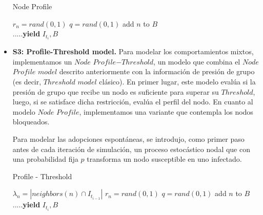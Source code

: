 \documentclass{article}
\begin{document}
\begin{itemize}
\begin{algorithm} 
	\caption{Node Profile}
	\begin{algorithmic}[1]	
		\State $r_n = rand(0,1)$
		\Else 
			\State $ q = rand(0,1)$
			\State add $n$ to $B$
			\EndIf
		\EndIf
		\EndIf
		\EndFor
	\\ \textbf{$.....$yield} $I_{t_i}, B$
	
	\EndFor
	\end{algorithmic}
\end{algorithm}

 \item \textbf{S3: Profile-Threshold model.}
Para modelar los comportamientos mixtos, implementamos un $Node$ $Profile$$-$$Threshold$, un modelo que combina el $Node$ $Profile$ $model$ descrito anteriormente con la información de presión de grupo (es decir, $Threshold$ $model$ clásico). En primer lugar, este modelo evalúa si la presión de grupo que recibe un nodo es suficiente para superar su $Threshold$, luego, si se satisface dicha restricción, evalúa el perfil del nodo. En cuanto al modelo $Node$ $Profile$, implementamos una variante que contempla los nodos bloqueados. 

Para modelar las adopciones espontáneas, se introdujo, como primer paso antes de cada iteración de simulación, un proceso estocástico nodal que con una probabilidad fija $p$ transforma un nodo susceptible en uno infectado.
\begin{algorithm} 
	\caption{Profile - Threshold}
	\begin{algorithmic}[1]	
		\State $\lambda_n = | neighbors(n)\cap I_{t_{i-1}}| $
		\State $r_n = rand(0,1)$
		\Else 
		\State $ q = rand(0,1)$
		\State add $n$ to $B$
		\EndIf
		\EndIf
		\EndIf
		\EndIf
		\EndFor
	\\ \textbf{$..... $yield} $I_{t_i}, B$
	\EndFor
	\end{algorithmic}
\end{algorithm}
\end{itemize}
\end{document}
